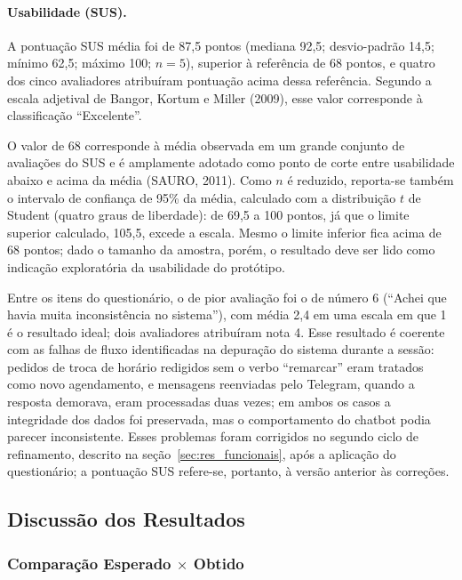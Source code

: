 \documentclass[12pt,a4paper]{extarticle}
\begin{document}
\paragraph{Usabilidade (SUS).}
\label{sec:res_usabilidade}
A pontuação SUS média foi de 87,5 pontos (mediana 92,5; desvio-padrão 14,5; mínimo 62,5; máximo 100; $n=5$), superior à referência de 68 pontos, e quatro dos cinco avaliadores atribuíram pontuação acima dessa referência. Segundo a escala adjetival de Bangor, Kortum e Miller (2009), esse valor corresponde à classificação ``Excelente''.

O valor de 68 corresponde à média observada em um grande conjunto de avaliações do SUS e é amplamente adotado como ponto de corte entre usabilidade abaixo e acima da média (SAURO, 2011). Como $n$ é reduzido, reporta-se também o intervalo de confiança de 95\% da média, calculado com a distribuição $t$ de Student (quatro graus de liberdade): de 69,5 a 100 pontos, já que o limite superior calculado, 105,5, excede a escala. Mesmo o limite inferior fica acima de 68 pontos; dado o tamanho da amostra, porém, o resultado deve ser lido como indicação exploratória da usabilidade do protótipo.

Entre os itens do questionário, o de pior avaliação foi o de número 6 (``Achei que havia muita inconsistência no sistema''), com média 2,4 em uma escala em que 1 é o resultado ideal; dois avaliadores atribuíram nota 4. Esse resultado é coerente com as falhas de fluxo identificadas na depuração do sistema durante a sessão: pedidos de troca de horário redigidos sem o verbo ``remarcar'' eram tratados como novo agendamento, e mensagens reenviadas pelo Telegram, quando a resposta demorava, eram processadas duas vezes; em ambos os casos a integridade dos dados foi preservada, mas o comportamento do chatbot podia parecer inconsistente. Esses problemas foram corrigidos no segundo ciclo de refinamento, descrito na seção~\ref{sec:res_funcionais}, após a aplicação do questionário; a pontuação SUS refere-se, portanto, à versão anterior às correções.

\subsection{Discussão dos Resultados}
\label{sec:discussao}

\subsubsection{Comparação Esperado $\times$ Obtido}
\label{sec:esperado_obtido}
\end{document}
